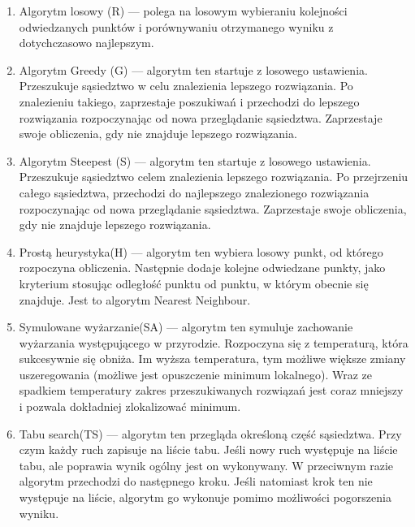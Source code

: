 \begin{enumerate}

\item Algorytm losowy (R) --- polega na losowym wybieraniu kolejności odwiedzanych punktów i 
porównywaniu otrzymanego wyniku z dotychczasowo najlepszym.

\item Algorytm Greedy (G) --- algorytm ten startuje z losowego ustawienia. Przeszukuje 
sąsiedztwo w celu znalezienia lepszego rozwiązania. Po znalezieniu takiego, zaprzestaje 
poszukiwań i przechodzi do lepszego rozwiązania rozpoczynając od nowa przeglądanie sąsiedztwa.
Zaprzestaje swoje obliczenia, gdy nie znajduje lepszego rozwiązania.

\item Algorytm Steepest (S) --- algorytm ten startuje z losowego ustawienia. Przeszukuje 
sąsiedztwo celem znalezienia lepszego rozwiązania. Po przejrzeniu całego sąsiedztwa, przechodzi 
do najlepszego znalezionego rozwiązania rozpoczynając od nowa przeglądanie sąsiedztwa.
Zaprzestaje swoje obliczenia, gdy nie znajduje lepszego rozwiązania.

\item Prostą heurystyka(H) --- algorytm ten wybiera losowy punkt, od którego rozpoczyna obliczenia.
Następnie dodaje kolejne odwiedzane punkty, jako kryterium stosując odległość punktu od punktu, w 
którym obecnie się znajduje. Jest to algorytm Nearest Neighbour.

\item Symulowane wyżarzanie(SA) --- algorytm ten symuluje zachowanie wyżarzania występującego w 
przyrodzie. Rozpoczyna się z temperaturą, która sukcesywnie się obniża. Im wyższa temperatura, tym
możliwe większe zmiany uszeregowania (możliwe jest opuszczenie minimum lokalnego). Wraz ze spadkiem 
temperatury zakres przeszukiwanych rozwiązań jest coraz mniejszy i pozwala dokładniej zlokalizować
minimum.

\item Tabu search(TS) --- algorytm ten przegląda określoną część sąsiedztwa. Przy czym każdy ruch 
zapisuje na liście tabu. Jeśli nowy ruch występuje na liście tabu, ale poprawia wynik ogólny jest
on wykonywany. W przeciwnym razie algorytm przechodzi do następnego kroku. Jeśli natomiast krok 
ten nie występuje na liście, algorytm go wykonuje pomimo możliwości pogorszenia wyniku.


\end{enumerate}

